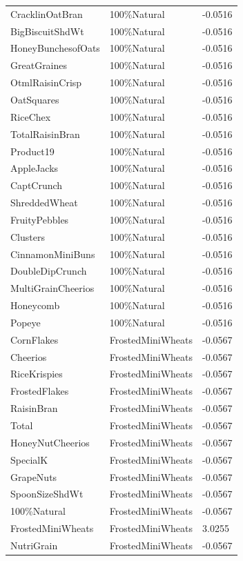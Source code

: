 \begin{table}[!htbp]
\begin{tabular}{lll}
CracklinOatBran & 100\%Natural & -0.0516
\\
BigBiscuitShdWt & 100\%Natural & -0.0516
\\
HoneyBunchesofOats & 100\%Natural & -0.0516
\\
GreatGraines & 100\%Natural & -0.0516
\\
OtmlRaisinCrisp & 100\%Natural & -0.0516
\\
OatSquares & 100\%Natural & -0.0516
\\
RiceChex & 100\%Natural & -0.0516
\\
TotalRaisinBran & 100\%Natural & -0.0516
\\
Product19 & 100\%Natural & -0.0516
\\
AppleJacks & 100\%Natural & -0.0516
\\
CaptCrunch & 100\%Natural & -0.0516
\\
ShreddedWheat & 100\%Natural & -0.0516
\\
FruityPebbles & 100\%Natural & -0.0516
\\
Clusters & 100\%Natural & -0.0516
\\
CinnamonMiniBuns & 100\%Natural & -0.0516
\\
DoubleDipCrunch & 100\%Natural & -0.0516
\\
MultiGrainCheerios & 100\%Natural & -0.0516
\\
Honeycomb & 100\%Natural & -0.0516
\\
Popeye & 100\%Natural & -0.0516
\\
CornFlakes & FrostedMiniWheats & -0.0567
\\
Cheerios & FrostedMiniWheats & -0.0567
\\
RiceKrispies & FrostedMiniWheats & -0.0567
\\
FrostedFlakes & FrostedMiniWheats & -0.0567
\\
RaisinBran & FrostedMiniWheats & -0.0567
\\
Total & FrostedMiniWheats & -0.0567
\\
HoneyNutCheerios & FrostedMiniWheats & -0.0567
\\
SpecialK & FrostedMiniWheats & -0.0567
\\
GrapeNuts & FrostedMiniWheats & -0.0567
\\
SpoonSizeShdWt & FrostedMiniWheats & -0.0567
\\
100\%Natural & FrostedMiniWheats & -0.0567
\\
FrostedMiniWheats & FrostedMiniWheats & 3.0255
\\
NutriGrain & FrostedMiniWheats & -0.0567

\end{tabular}
\end{table}
